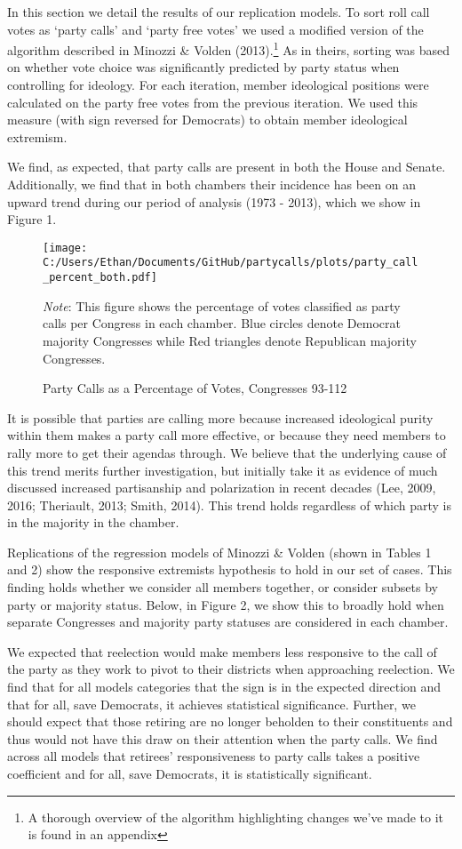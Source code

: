 \documentclass[12pt]{article}
\newcommand\fnote[1]{\captionsetup{font=small}\caption*{#1}}
\begin{document}
In this section we detail the results of our replication models. To sort roll call votes as `party calls' and `party free votes' we used a modified version of the algorithm described in Minozzi \& Volden (2013).\footnote{A thorough overview of the algorithm highlighting changes we've made to it is found in an appendix} As in theirs, sorting was based on whether vote choice was significantly predicted by party status when controlling for ideology. For each iteration, member ideological positions were calculated on the party free votes from the previous iteration. We used this measure (with sign reversed for Democrats) to obtain member ideological extremism. 

We find, as expected, that party calls are present in both the House and Senate. Additionally, we find that in both chambers their incidence has been on an upward trend during our period of analysis (1973 - 2013), which we show in Figure 1. 


\begin{figure}[H]
	\centering
	\caption{Party Calls as a Percentage of Votes, Congresses 93-112}
	\texttt{[image: C:/Users/Ethan/Documents/GitHub/partycalls/plots/party\_call\_percent\_both.pdf]}
	\fnote{\textit{Note}: This figure shows the percentage of votes classified as party calls per Congress in each chamber. Blue circles denote Democrat majority Congresses while Red triangles denote Republican majority Congresses.}
\end{figure}

\noindent
It is possible that parties are calling more because increased ideological purity within them makes a party call more effective, or because they need members to rally more to get their agendas through. We believe that the underlying cause of this trend merits further investigation, but initially take it as evidence of much discussed increased partisanship and polarization in recent decades (Lee, 2009, 2016; Theriault, 2013; Smith, 2014). This trend holds regardless of which party is in the majority in the chamber.

Replications of the regression models of Minozzi \& Volden (shown in Tables 1 and 2) show the responsive extremists hypothesis to hold in our set of cases. This finding holds whether we consider all members together, or consider subsets by party or majority status. Below, in Figure 2, we show this to broadly hold when separate Congresses and majority party statuses are considered in each chamber.

We expected that reelection would make members less responsive to the call of the party as they work to pivot to their districts when approaching reelection. We find that for all models categories that the sign is in the expected direction and that for all, save Democrats, it achieves statistical significance. Further, we should expect that those retiring are no longer beholden to their constituents and thus would not have this draw on their attention when the party calls. We find across all models that retirees' responsiveness to party calls takes a positive coefficient and for all, save Democrats, it is statistically significant. 
\end{document}

